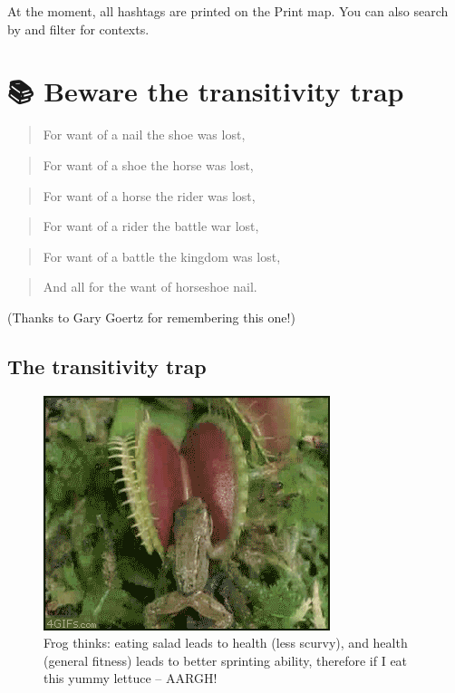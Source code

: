\documentclass[
]{book}
\begin{document}
At the moment, all hashtags are printed on the Print map. You can also search by and filter for contexts.

\hypertarget{xtransitivity-trap}{%
\chapter{📚 Beware the transitivity trap}\label{xtransitivity-trap}}

\begin{quote}
For want of a nail the shoe was lost,
\end{quote}

\begin{quote}
For want of a shoe the horse was lost,
\end{quote}

\begin{quote}
For want of a horse the rider was lost,
\end{quote}

\begin{quote}
For want of a rider the battle war lost,
\end{quote}

\begin{quote}
For want of a battle the kingdom was lost,
\end{quote}

\begin{quote}
And all for the want of horseshoe nail.
\end{quote}

(Thanks to Gary Goertz for remembering this one!)

\hypertarget{the-transitivity-trap}{%
\section{The transitivity trap}\label{the-transitivity-trap}}

\begin{figure}
\centering
\includegraphics{_assets/giphy.gif}
\caption{Frog thinks: eating salad leads to health (less scurvy), and health (general fitness) leads to better sprinting ability, therefore if I eat this yummy lettuce -- AARGH!}
\end{figure}
\end{document}
